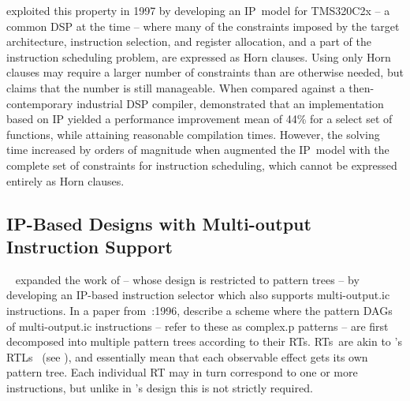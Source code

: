 \textcite{Gebotys:1997} exploited this property in 1997 by developing an
\gls{IP}~model for \gls{TMS320C2x} -- a common \gls{DSP} at the time -- where
many of the \glspl{constraint} imposed by the target architecture,
\gls{instruction selection}, and \gls{register allocation}, and a part of the
\gls{instruction scheduling} problem, are expressed as \glspl{Horn clause}.
%
Using only \glspl{Horn clause} may require a larger number of \glspl{constraint}
than are otherwise needed, but \citeauthor{Gebotys:1997} claims that the number
is still manageable.
%
When compared against a then-contemporary industrial \gls{DSP} \gls{compiler},
\citeauthor{Gebotys:1997} demonstrated that an implementation based on \gls{IP}
yielded a performance improvement mean of 44\% for a select set of functions,
while attaining reasonable compilation times.
%
However, the solving time increased by orders of magnitude when
\citeauthor{Gebotys:1997} augmented the \gls{IP}~model with the complete set of
\glspl{constraint} for \gls{instruction scheduling}, which cannot be expressed
entirely as \glspl{Horn clause}.


\subsection{IP-Based Designs with Multi-output Instruction Support}

\citeauthor{LeupersMarwedel:1996}~\cite{LeupersMarwedel:1995,
  LeupersMarwedel:1996} expanded the work of \citeauthor{WilsonEtAl:1994} --
whose design is restricted to \glspl{pattern tree} -- by developing an
\gls{IP}-based \gls{instruction selector} which also supports
\gls{multi-output.ic} \glspl{instruction}.
%
In a paper from~:1996, \citeauthor{LeupersMarwedel:1996} describe a scheme where the
\glspl{pattern DAG} of \gls{multi-output.ic} \glspl{instruction} --
\citeauthor{LeupersMarwedel:1996} refer to these as \gls{complex.p} \glspl{pattern} --
are first decomposed into multiple \glspl{pattern tree} according to their
\glspl{RT}.
%
\glspl{RT}~are akin to \citeauthor{Fraser:1979}'s \glspl{RTL}~\cite{Fraser:1979}
(see ), and essentially mean that each
observable effect gets its own \gls{pattern tree}.
%
Each individual \gls{RT} may in turn correspond to one or more
\glspl{instruction}, but unlike in \citeauthor{Fraser:1979}'s design this is not
strictly required.

